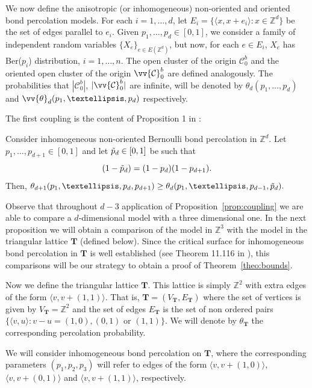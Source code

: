 \documentclass{aptpub}
\newcommand{\Z}{\mathbb{Z}}
\begin{document}
We now define the anisotropic (or inhomogeneous) non-oriented and oriented bond percolation models. For each $i=1, \dots, d$, let $E_i = \{ \langle x, x + e_i \rangle: x \in \Z^d\}$ be the set of edges parallel to $e_i$. Given $p_1, \dots, p_d \in [0,1]$,  we consider a family of independent random variables $\{X_e\}_{e \in E(\Z^d)}$, but now, for each $e \in E_i$, $X_e$ has Ber($p_i$) distribution, $i=1, \dots, n$. The open cluster of the origin $\mathcal{C}^b_0$ and the oriented open cluster of the origin $\vv{\mathcal{C}}^b_0$ are  defined analogously. The probabilities that $|\mathcal{C}^b_0|$, $|\vv{\mathcal{C}}^b_0|$ are infinite, will be denoted by $\theta_d(p_1, \dots, p_d)$ and $\vv{\theta}_d (p_1, \dots, p_d)$ respectively.



The first coupling is the content of Proposition 1 in \cite{GPS2}:
\begin{prop} \cite[Proposition 1]{GPS2} \label{prop:coupling} 
Consider inhomogeneous non-oriented Bernoulli bond percolation in $\Z^d$. Let $p_1, \dots, p_{d+1} \in [0,1]$ and let $\Tilde{p}_d \in [0,1]$ be such that \[(1-\Tilde{p}_d) = (1-p_d)(1-p_{d+1}).\] Then,
    $\theta_{d+1}(p_1, \dots,p_d,  p_{d+1})  \geq \theta_{d}(p_1, \dots, p_{d-1}, \Tilde{p}_{d}) .$
\end{prop}





Observe that throughout $d-3$ application of Proposition~\ref{prop:coupling} we are able to compare a $d$-dimensional model with a three dimensional one. In the next proposition we will obtain a comparison of the model in $\Z^3$ with the model in the triangular lattice $\mathbf{T}$ (defined below). Since the critical surface for inhomogeneous bond percolation in $\mathbf{T}$ is well established (see Theorem 11.116 in \cite{Grim}), this comparisons will be our strategy to obtain a proof of Theorem~\ref{theo:bounds}.

Now we define the triangular lattice $\mathbf{T}$. This lattice is simply $\Z^2$ with  extra edges of the form $\langle v,v+(1,1)\rangle$. That is, $\mathbf{T} = (V_{\mathbf{T}}, E_{\mathbf{T}})$ where the set of vertices is given by $V_{\mathbf{T}} = \Z^2$ and the set of edges $E_{\mathbf{T}}$ is the set of non ordered pairs $\{\langle v, u\rangle : v-u = (1,0), (0,1) \text{ or } (1,1) \}$. We will denote by $\theta_{\mathbf{T}}$  the corresponding percolation probability. 

We will consider inhomogeneous bond percolation on $\mathbf{T}$, where the corresponding parameters $(p_1,p_2,p_3)$ will refer to edges of the form $\langle v,v+(1,0)\rangle$, $\langle v,v+(0,1)\rangle$ and $\langle v,v+(1,1)\rangle$, respectively. 
\end{document}
